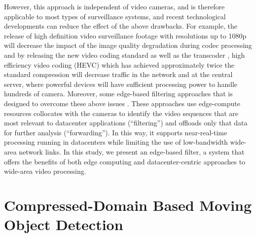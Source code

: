 However, this approach is independent of video cameras, and is therefore applicable to most types of surveillance systems, and recent technological developments can reduce the effect of the above drawbacks. For example, the release of high definition video surveillance footage with resolutions up to 1080p will decrease the impact of the image quality degradation during codec processing and by releasing the new video coding standard as well as the transcoder \cite{thanh2019efficient}, high efficiency video coding (HEVC)\cite{sullivan2012overview} which has achieved approximately twice the standard compression\cite{ohm2012comparison} will decrease traffic in the network and at the central server, where powerful devices will have sufficient processing power to handle hundreds of camera. Moreover, some edge-based filtering approaches that
is designed to overcome these above issues \cite{canel2019scaling}\cite{li2020reducto}\cite{chen2015glimpse}. These approaches use edge-compute resources collocates with the cameras to identify the video sequences that are most relevant to datacenter applications (“filtering”) and offloads only that data for further analysis (“forwarding”). In this way, it supports near-real-time processing running in datacenters while limiting the use of low-bandwidth wide-area network links. In this study, we present an edge-based filter, a system that offers the benefits of both edge computing and datacenter-centric approaches to wide-area video processing.
\section{Compressed-Domain Based Moving Object Detection}




